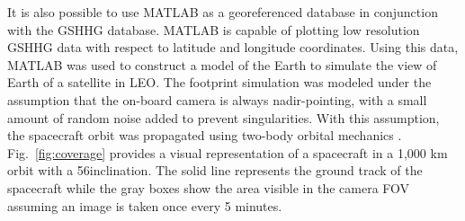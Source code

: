 \documentclass[]{aiaa-tc}%
\begin{document}
It is also possible to use MATLAB as a georeferenced database in conjunction with the GSHHG database.  MATLAB is capable of plotting low resolution GSHHG data with respect to latitude and longitude coordinates.  Using this data, MATLAB was used to construct a model of the Earth to simulate the view of Earth of a satellite in LEO.  The footprint simulation was modeled under the assumption that the on-board camera is always nadir-pointing, with a small amount of random noise added to prevent singularities.  With this assumption, the spacecraft orbit was propagated using two-body orbital mechanics \cite{UnderstandingSpace}.  Fig.~\ref{fig:coverage} provides a visual representation of a spacecraft in a 1,000 km orbit with a 56\degree inclination.  The solid line represents the ground track of the spacecraft while the gray boxes show the area visible in the camera FOV assuming an image is taken once every 5 minutes.
\end{document}
